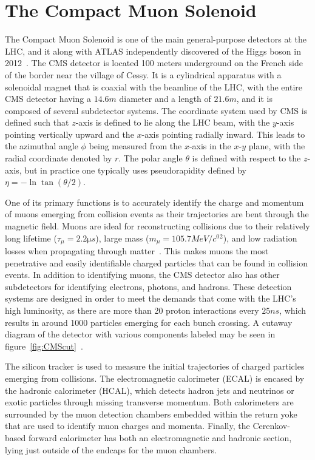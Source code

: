 \section{The Compact Muon Solenoid}
\label{sec:CMS}

The Compact Muon Solenoid is one of the main general-purpose detectors at the LHC, and it along with ATLAS independently discovered of the Higgs boson in 2012~\cite{20121,201230}.
The CMS detector is located 100 meters underground on the French side of the border near the village of Cessy.
It is a cylindrical apparatus with a solenoidal magnet that is coaxial with the beamline of the LHC, with the entire CMS detector having a $14.6\unit{m}$ diameter and a length of $21.6\unit{m}$, and it is composed of several subdetector systems.
The coordinate system used by CMS is defined such that $z$-axis is defined to lie along the LHC beam, with the $y$-axis pointing vertically upward and the $x$-axis pointing radially inward.
This leads to the azimuthal angle $\phi$ being measured from the $x$-axis in the $x$-$y$ plane, with the radial coordinate denoted by $r$.
The polar angle $\theta$ is defined with respect to the $z$-axis, but in practice one typically uses pseudorapidity defined by $\eta=-\ln\tan(\theta/2)$.

One of its primary functions is to accurately identify the charge and momentum of muons emerging from collision events as their trajectories are bent through the magnetic field.
Muons are ideal for reconstructing collisions due to their relatively long lifetime ($\tau_\mu=2.2\unit{\micro s}$), large mass ($m_\mu=105.7\unit{MeV/\clight^2}$), and low radiation losses when propagating through matter~\cite{peskin2019}.
This makes muons the most penetrative and easily identifiable charged particles that can be found in collision events. %
In addition to identifying muons, the CMS detector also has other subdetectors for identifying electrons, photons, and hadrons.
These detection systems are designed in order to meet the demands that come with the LHC's high luminosity, as there are more than 20 proton interactions every $25\unit{ns}$, which results in around 1000 particles emerging for each bunch crossing. %
A cutaway diagram of the detector with various components labeled may be seen in figure~\ref{fig:CMScut}~\cite{Sakuma:2665537}.

The silicon tracker is used to measure the initial trajectories of charged particles emerging from collisions.
The electromagnetic calorimeter (ECAL) is encased by the hadronic calorimeter (HCAL), which detects hadron jets and neutrinos or exotic particles through missing transverse momentum.
Both calorimeters are surrounded by the muon detection chambers embedded within the return yoke that are used to identify muon charges and momenta.
Finally, the Cerenkov-based forward calorimeter has both an electromagnetic and hadronic section, lying just outside of the endcaps for the muon chambers.

